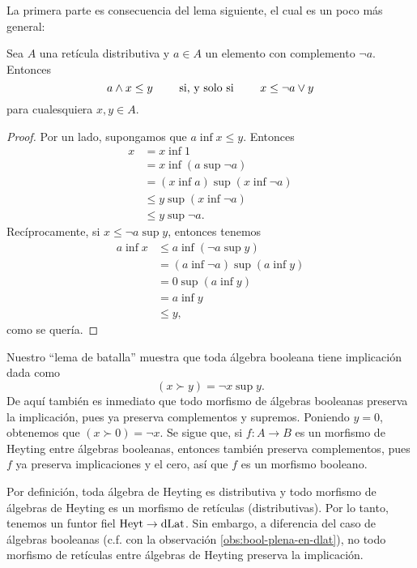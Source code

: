 La primera parte es consecuencia del lema siguiente, el cual es un
poco más general:

\begin{lemma}\label{lemma:caballo}
    Sea $A$ una retícula distributiva
    y $a\in A$ un elemento con complemento $\neg a$.
    Entonces
    \[
        a\wedge x \leq y  \qquad\text{ si, y solo si }\qquad x\leq \neg a\vee y
    \]
    para cualesquiera $x,y\in A$.
\end{lemma}
\begin{proof}
    Por un lado, supongamos que $a\inf x\leq y$.
    Entonces
    \begin{align*}
        x
        &= x \inf 1 \\
        &= x \inf (a\sup \neg a) \\
        &= (x\inf a)\sup(x\inf\neg a) \\
        &\leq y \sup (x\inf \neg a) \\
        &\leq y \sup \neg a.
    \end{align*}
    Recíprocamente, si $x\leq \neg a\sup y$, entonces tenemos
    \begin{align*}
        a\inf x
        &\leq a\inf(\neg a\sup y) \\
        &= (a\inf\neg a) \sup (a\inf y) \\
        &= 0\sup (a\inf y) \\
        &= a\inf y \\
        &\leq y,
    \end{align*}
    como se quería.
\end{proof}

Nuestro ``lema de batalla'' muestra que toda álgebra booleana tiene
implicación dada como \[(x\succ y)=\neg x\sup y.\] De aquí también es
inmediato que todo morfismo de álgebras booleanas preserva
la implicación, pues ya preserva complementos y supremos.
Poniendo $y=0$, obtenemos que $(x\succ 0)=\neg x$.
Se sigue que, si $f\colon A\rightarrow B$ es un morfismo de Heyting entre
álgebras booleanas, entonces también preserva complementos, pues $f$
ya preserva implicaciones y el cero, así que $f$ es un morfismo
booleano.

Por definición, toda álgebra de Heyting es distributiva y todo
morfismo de álgebras de Heyting es un morfismo de retículas
(distributivas). Por lo tanto, tenemos un funtor fiel $\mathrm{Heyt}\to\mathrm{dLat}$.
Sin embargo, a diferencia del caso de álgebras booleanas (c.f. con la
observación \ref{obs:bool-plena-en-dlat}), no todo morfismo de
retículas entre álgebras de Heyting preserva la implicación.


